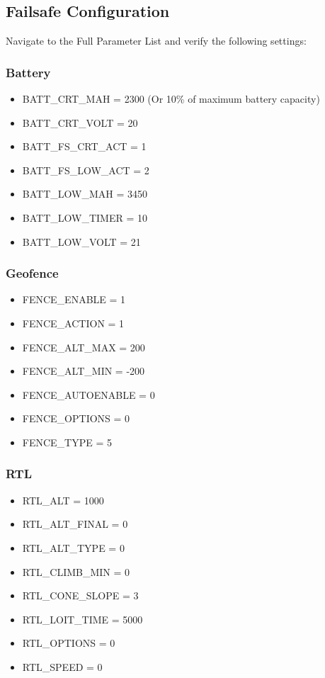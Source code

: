     \subsection{Failsafe Configuration} Navigate to the Full Parameter List and verify the following settings:
        \subsubsection{Battery} 
        \begin{itemize}
            \item BATT\_CRT\_MAH = 2300 (Or 10\% of maximum battery capacity)
            \item BATT\_CRT\_VOLT = 20
            \item BATT\_FS\_CRT\_ACT = 1
            \item BATT\_FS\_LOW\_ACT = 2
            \item BATT\_LOW\_MAH = 3450
            \item BATT\_LOW\_TIMER = 10
            \item BATT\_LOW\_VOLT = 21
        \end{itemize}
        \subsubsection{Geofence} 
        \begin{itemize}
            \item FENCE\_ENABLE = 1
            \item FENCE\_ACTION = 1
            \item FENCE\_ALT\_MAX = 200
            \item FENCE\_ALT\_MIN = -200
            \item FENCE\_AUTOENABLE = 0
            \item FENCE\_OPTIONS = 0
            \item FENCE\_TYPE = 5
        \end{itemize}
        \subsubsection{RTL} 
        \begin{itemize}
            \item RTL\_ALT = 1000
            \item RTL\_ALT\_FINAL  = 0
            \item RTL\_ALT\_TYPE = 0
            \item RTL\_CLIMB\_MIN = 0
            \item RTL\_CONE\_SLOPE = 3
            \item RTL\_LOIT\_TIME = 5000
            \item RTL\_OPTIONS = 0
            \item RTL\_SPEED = 0

        \end{itemize}
